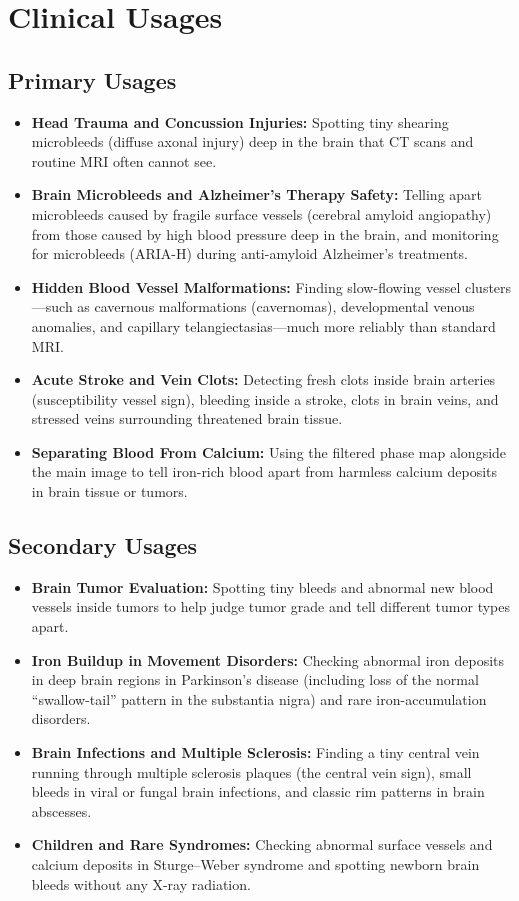 \section{Clinical Usages}

\subsection{Primary Usages}

\begin{itemize}
    \item \textbf{Head Trauma and Concussion Injuries:} Spotting tiny shearing microbleeds (diffuse axonal injury) deep in the brain that CT scans and routine MRI often cannot see.
    \item \textbf{Brain Microbleeds and Alzheimer's Therapy Safety:} Telling apart microbleeds caused by fragile surface vessels (cerebral amyloid angiopathy) from those caused by high blood pressure deep in the brain, and monitoring for microbleeds (ARIA-H) during anti-amyloid Alzheimer's treatments.
    \item \textbf{Hidden Blood Vessel Malformations:} Finding slow-flowing vessel clusters---such as cavernous malformations (cavernomas), developmental venous anomalies, and capillary telangiectasias---much more reliably than standard MRI.
    \item \textbf{Acute Stroke and Vein Clots:} Detecting fresh clots inside brain arteries (susceptibility vessel sign), bleeding inside a stroke, clots in brain veins, and stressed veins surrounding threatened brain tissue.
    \item \textbf{Separating Blood From Calcium:} Using the filtered phase map alongside the main image to tell iron-rich blood apart from harmless calcium deposits in brain tissue or tumors.
\end{itemize}

\subsection{Secondary Usages}

\begin{itemize}
    \item \textbf{Brain Tumor Evaluation:} Spotting tiny bleeds and abnormal new blood vessels inside tumors to help judge tumor grade and tell different tumor types apart.
    \item \textbf{Iron Buildup in Movement Disorders:} Checking abnormal iron deposits in deep brain regions in Parkinson's disease (including loss of the normal ``swallow-tail'' pattern in the substantia nigra) and rare iron-accumulation disorders.
    \item \textbf{Brain Infections and Multiple Sclerosis:} Finding a tiny central vein running through multiple sclerosis plaques (the central vein sign), small bleeds in viral or fungal brain infections, and classic rim patterns in brain abscesses.
    \item \textbf{Children and Rare Syndromes:} Checking abnormal surface vessels and calcium deposits in Sturge--Weber syndrome and spotting newborn brain bleeds without any X-ray radiation.
\end{itemize}

